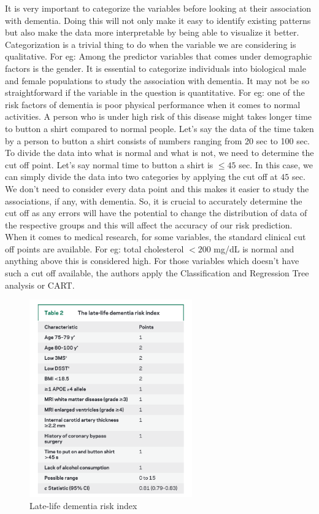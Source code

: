 \documentclass[12pt,letterpaper]{article}
\begin{document}
It is very important to categorize the variables before looking at their association with dementia. Doing this will not only make it easy to identify existing patterns but also make the data more interpretable by being able to visualize it better. Categorization is a trivial thing to do when the variable we are considering is qualitative. For eg: Among the predictor variables that comes under demographic factors is the gender. It is essential to categorize individuals into biological male and female populations to study the association with dementia. It may not be so straightforward if the variable in the question is quantitative. For eg: one of the risk factors of dementia is poor physical performance when it comes to normal activities. A person who is under high risk of this disease might takes longer time to button a shirt compared to normal people.  Let's say the data of the time taken by a person to button a shirt consists of numbers ranging from 20 sec to 100 sec. To divide the data into what is normal and what is not, we need to determine the cut off point. Let's say normal time to button a shirt is $\leq45$ sec. In this case, we can simply divide the data into two categories by applying the cut off at $45$ sec. We don't need to consider every data point and this makes it easier to study the associations, if any, with dementia. So, it is crucial to accurately determine the cut off as any errors will have the potential to change the distribution of data of the respective groups and this will affect the accuracy of our risk prediction. When it comes to medical research, for some variables, the standard clinical cut off points are available. For eg: total cholesterol $<200$ mg/dL is normal and anything above this is considered high. For those variables which doesn't have such a cut off available, the authors apply the Classification and Regression Tree analysis or CART.\\
\begin{figure}
\vspace{-7 mm}
\includegraphics[width=7cm]{riskindex.png}
\caption{Late-life dementia risk index}
\label{risk}
\end{figure}
\end{document}
